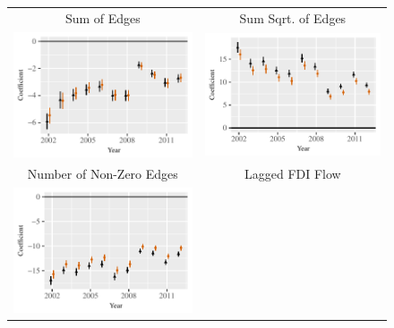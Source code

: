 \documentclass{article}
\begin{document}
\begin{figure}[htp]
\centering
\begin{tabular}{c@{\hskip -.4cm}c}
Sum of Edges&
Sum Sqrt. of Edges\\
\includegraphics[height=.22\textheight, clip=true, trim=0cm .5cm 0cm .1cm]{draft_figures/rl_plots/Sum.pdf}    &
\includegraphics[height=.22\textheight, clip=true, trim=.5cm .5cm 0cm .1cm]{draft_figures/rl_plots/Sum_5.pdf}   \\
Number of Non-Zero Edges &
Lagged FDI Flow\\
\includegraphics[height=.22\textheight, clip=true, trim=0cm .5cm 0cm .1cm]{draft_figures/rl_plots/Nonzero.pdf} &

\end{tabular}
\end{figure}
\end{document}
